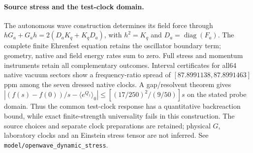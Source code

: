 \paragraph{Source stress and the test-clock domain.}
The autonomous wave construction determines its field force through
$hG_a+G_ah=2(D_aK_q+K_qD_a)$, with $h^2=K_q$ and
$D_a=\operatorname{diag}(F_a)$. The complete finite Ehrenfest equation
retains the oscillator boundary term; geometry, native and field energy
rates sum to zero. Full stress and momentum instruments retain all
complementary outcomes. Interval certificates for all64 native vacuum
sectors show a frequency-ratio spread of
$[87.8991138,87.8991463]$ppm among the seven dressed native clocks.
A gap/resolvent theorem gives
$|(f(s)-f(0))/s-\langle e^{Q_1}\rangle_0|
\leq[(17/250)^2/(9/50)]s$ on the stated probe domain. Thus the common
test-clock response has a quantitative backreaction bound, while exact
finite-strength universality fails in this construction. The source
choices and separate clock preparations are retained; physical $G$,
laboratory clocks and an Einstein stress tensor are not inferred.
See \texttt{model/openwave\_dynamic\_stress}.
